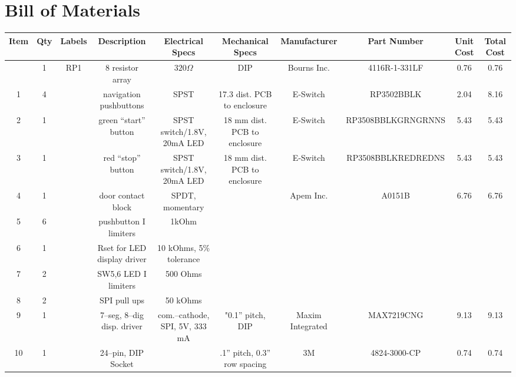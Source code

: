 \documentclass[10pt, twocolumn]{article}
\begin{document}
\pagebreak
\section{Bill of Materials}

\begin{center}
\begin{adjustbox}{max width=\textwidth}
\begin{tabular}{c c c c c c c c c c}
\hline\hline
Item	&Qty	&Labels	&Description		&Electrical Specs		&Mechanical Specs
	&Manufacturer		&Part Number		&Unit Cost	&Total Cost	\\
\hline

	&1	&RP1	&8 resistor array	&$320\Omega$			&DIP
	&Bourns Inc.		&4116R-1-331LF		&0.76		&0.76		\\

1	&4	&	&navigation pushbuttons	&SPST				&17.3 dist. PCB to enclosure
	&E-Switch		&RP3502BBLK		&2.04		&8.16	\\

2	&1	&	&green “start” button	&SPST switch/1.8V, 20mA LED	&18 mm dist. PCB to enclosure
	&E-Switch		&RP3508BBLKGRNGRNNS	&5.43		&5.43	\\

3	&1	&	&red “stop” button	&SPST switch/1.8V, 20mA LED	&18 mm dist. PCB to enclosure
	&E-Switch		&RP3508BBLKREDREDNS	&5.43		&5.43	\\

4	&1	&	&door contact block	&SPDT, momentary		&
	&Apem Inc.		&A0151B			&6.76		&6.76	\\

5	&6	&	&pushbutton I limiters	&1kOhm				&
	&		&			&		&	\\

6	&1	&	&Rset for LED display driver	&10 kOhms, 5\% tolerance	&
	&		&			&		&	\\

7	&2	&	&SW5,6 LED I limiters	&500 Ohms			&
	&		&			&		&	\\

8	&2	&	&SPI pull ups		&50 kOhms			&
	&		&			&		&	\\

9	&1	&	&7--seg, 8--dig disp. driver	&com.--cathode, SPI, 5V, 333 mA	&"0.1” pitch, DIP
	&Maxim Integrated	&MAX7219CNG		&9.13		&9.13	\\

10	&1	&	&24--pin, DIP Socket	&				&.1” pitch, 0.3” row spacing
	&3M		&4824-3000-CP			&0.74		&0.74	\\


\end{tabular}
\end{adjustbox}
\end{center}
\end{document}
